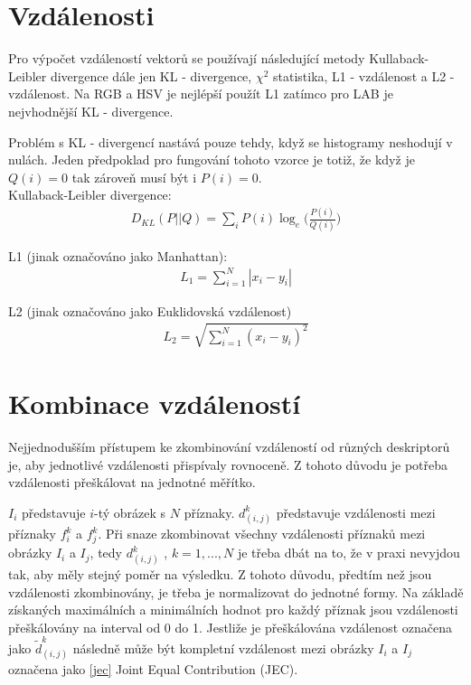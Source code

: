 \documentclass[czech,BP]{thesiskiv}
\begin{document}
\section{Vzdálenosti}
\par Pro výpočet vzdáleností vektorů se používají následující metody Kullaback-Leibler divergence dále jen KL - divergence, $\chi^2$ statistika, L1 - vzdálenost a L2 - vzdálenost. Na RGB a HSV je nejlépší použít L1 zatímco pro LAB je nejvhodnější KL - divergence. 

Problém s KL - divergencí nastává pouze tehdy, když se histogramy neshodují v nulách. Jeden předpoklad pro fungování tohoto vzorce je totiž, že když je $Q(i) = 0$ tak zároveň musí být i $P(i) = 0$. \\

Kullaback-Leibler divergence:
\begin{align}
   \label{kl}  D_{KL} (P || Q) = \sum_{i} P(i) \log_e \bigg({\frac{P(i)}{Q(i)}} \bigg) 
\end{align}

L1 (jinak označováno jako Manhattan):
\begin{align}
   \label{L1} L_1 = \sum_{i=1}^{N} |x_i - y_i|  
\end{align}

L2 (jinak označováno jako Euklidovská vzdálenost)
\begin{align}
   \label{L2} L_2 = \sqrt{\sum_{i=1}^{N} (x_i - y_i)^2}  
\end{align}
 
\section{Kombinace vzdáleností}
\par Nejjednodušším přístupem ke zkombinování vzdáleností od různých deskriptorů je, aby jednotlivé vzdálenosti přispívaly rovnoceně. Z tohoto důvodu je potřeba vzdálenosti přeškálovat na jednotné měřítko.

\par $I_i$ představuje $i$-tý obrázek s $N$ příznaky. $d_{(i,j)}^k$ představuje vzdálenosti mezi příznaky $f_i^k$ a $f_j^k$. Při snaze zkombinovat všechny vzdálenosti příznaků mezi obrázky $I_i$ a $I_j$, tedy $d_{(i,j)}^k$ , $k=1, ..., N$  je třeba dbát na to, že v praxi nevyjdou tak, aby měly stejný poměr na výsledku. Z tohoto důvodu, předtím než jsou vzdálenosti zkombinovány, je třeba je normalizovat do jednotné formy. Na základě získaných maximálních a minimálních hodnot pro každý příznak jsou vzdálenosti přeškálovány na interval od 0 do 1. Jestliže je přeškálována vzdálenost označena jako ${\tilde{d}_{(i,j)}^k}$ následně může být kompletní vzdálenost mezi obrázky $I_i$ a $I_j$ označena jako \eqref{jec} Joint Equal Contribution (JEC).  
\end{document}
